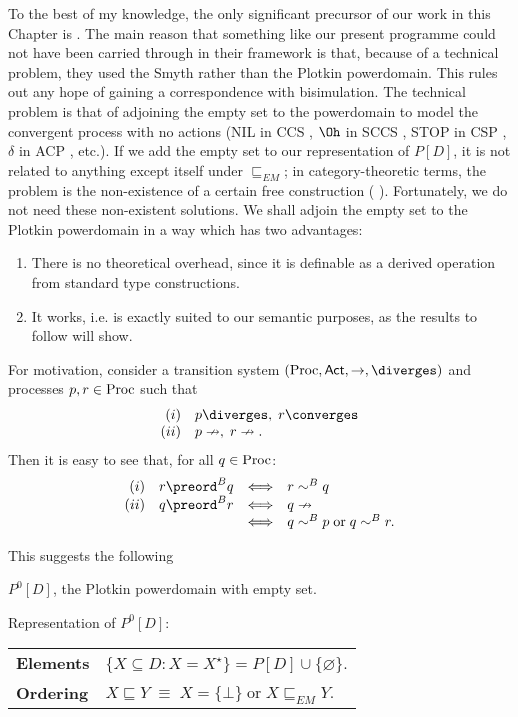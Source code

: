 To the best of my knowledge, the only significant precursor of our work in this Chapter is \cite{MM79}.
The main reason that something like our present programme could not have been carried through in their framework is that, because of a technical problem, they used the Smyth rather than the Plotkin powerdomain.
This rules out any hope of gaining a correspondence with bisimulation.
The technical problem is that of adjoining the empty set to the
powerdomain to model the convergent process with no actions (NIL in CCS
\cite{Mil80}, $\Oh$ in SCCS \cite{Mil83}, STOP in CSP \cite{Hoa85},
$\delta$ in ACP \cite{BK84}, etc.).
If we add the empty set to our representation of $P[D]$, it is not related to
anything except itself under $\sqsubseteq_{EM}$; in category-theoretic
terms, the problem is the non-existence of a certain free construction
(\cite{PloLN} ).
Fortunately, we do not need these non-existent solutions.
We shall adjoin the empty set to the Plotkin powerdomain in a way which
has two advantages:
\begin{enumerate}
\item There is no theoretical overhead, since it is definable as a derived
operation from standard type constructions.
\item It works, i.e. is exactly suited to our semantic purposes, as the
results to follow will show.
\end{enumerate}


For motivation, consider a transition system $({\rm Proc}, {\sf Act}, \rightarrow ,
\diverges )$ and processes $p, r \in {\rm Proc}$ such that
\[ \begin{array}{rl}
(i) & p\diverges , \; r \converges \\
(ii) & p \nrightarrow , \; r \nrightarrow .
\end{array} \]
Then it is easy to see that, for all $q \in {\rm Proc}$:
\[ \begin{array}{rlcl}
(i) & r \preord^{B} q & \Longleftrightarrow & r \sim^{B} q \\
(ii) & q \preord^{B} r & \Longleftrightarrow & q \nrightarrow \\
& & \Longleftrightarrow & q \sim^{B} p \; \mbox{or} \; q \sim^{B} r .
\end{array} \]

This suggests the following
\begin{definition}
{\rm $P^{0}[D]$, the Plotkin powerdomain with empty set.

\noindent Representation of $P^{0}[D]$:
\begin{center}
\begin{tabular}{ll}
{\bf Elements} & $\{ X \subseteq D : X = X^{\star} \} = P[D] \cup \{
\varnothing \}$. \\
{\bf Ordering} & $X \sqsubseteq Y \; \equiv \; X = \{ \bot \} \; \mbox{or} \;
X \sqsubseteq _{EM} Y$.
\end{tabular}
\end{center}}
\end{definition}

